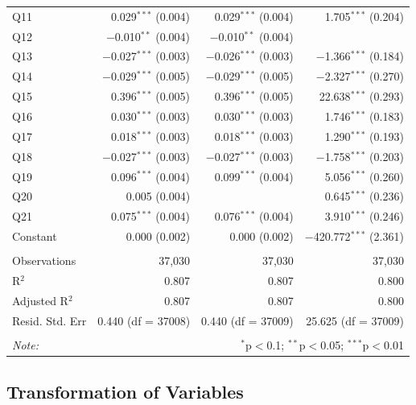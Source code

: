 \documentclass[11pt,a4paper]{report}
\begin{document}
\begin{table}[p]
\begin{tabular}{@{\extracolsep{5pt}}lrrr}
		Q11 & 0.029$^{***}$ (0.004) & 0.029$^{***}$ (0.004) & 1.705$^{***}$ (0.204)  \\[0.2cm] 
		Q12 & $-$0.010$^{**}$ (0.004) & $-$0.010$^{**}$ (0.004) &   \\[0.2cm] 
		Q13 & $-$0.027$^{***}$ (0.003) & $-$0.026$^{***}$ (0.003) & $-$1.366$^{***}$ (0.184)  \\[0.2cm] 
		Q14 & $-$0.029$^{***}$ (0.005) & $-$0.029$^{***}$ (0.005) & $-$2.327$^{***}$ (0.270)  \\[0.2cm] 
		Q15 & 0.396$^{***}$ (0.005) & 0.396$^{***}$ (0.005) & 22.638$^{***}$ (0.293)  \\[0.2cm] 
		Q16 & 0.030$^{***}$ (0.003) & 0.030$^{***}$ (0.003) & 1.746$^{***}$ (0.183)  \\[0.2cm] 
		Q17 & 0.018$^{***}$ (0.003) & 0.018$^{***}$ (0.003) & 1.290$^{***}$ (0.193)  \\[0.2cm] 
		Q18 & $-$0.027$^{***}$ (0.003) & $-$0.027$^{***}$ (0.003) & $-$1.758$^{***}$ (0.203)  \\[0.2cm] 
		Q19 & 0.096$^{***}$ (0.004) & 0.099$^{***}$ (0.004) & 5.056$^{***}$ (0.260)  \\[0.2cm] 
		Q20 & 0.005 (0.004) &  & 0.645$^{***}$ (0.236)  \\[0.2cm] 
		Q21 & 0.075$^{***}$ (0.004) & 0.076$^{***}$ (0.004) & 3.910$^{***}$ (0.246)  \\[0.2cm] 
		Constant & 0.000 (0.002) & 0.000 (0.002) & $-$420.772$^{***}$ (2.361)  \\[0.2cm] 
		\hline \\[-1.8ex] 
		Observations & 37,030 & 37,030 & 37,030 \\ 
		R$^{2}$ & 0.807 & 0.807 & 0.800 \\ 
		Adjusted R$^{2}$ & 0.807 & 0.807 & 0.800 \\ 
		Resid. Std. Err & 0.440 (df = 37008) & 0.440 (df = 37009) & 25.625 (df = 37009) \\ 
		\hline 
		\hline \\[-1.8ex] 
		\textit{Note:}  & \multicolumn{3}{r}{$^{*}$p$<$0.1; $^{**}$p$<$0.05; $^{***}$p$<$0.01} \\ 
	\end{tabular} 
	\label{table:regresults}
\end{table} 
\newpage


\subsection{Transformation of Variables}\label{BoxCoxSection}
\end{document}
